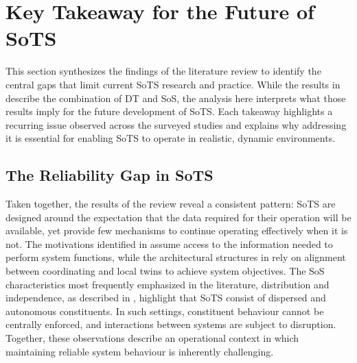 \section{Key Takeaway for the Future of SoTS}\label{sec:literature-review-key-takeaways}
This section synthesizes the findings of the literature review to identify the central gaps that limit current SoTS research and practice. While the results in  describe the combination of DT and SoS, the analysis here interprets what those results imply for the future development of SoTS. Each takeaway highlights a recurring issue observed across the surveyed studies and explains why addressing it is essential for enabling SoTS to operate in realistic, dynamic environments.


\subsection*{The Reliability Gap in SoTS}
Taken together, the results of the review reveal a consistent pattern: SoTS are designed around the expectation that the data required for their operation will be available, yet provide few mechanisms to continue operating effectively when it is not. The motivations identified in  assume access to the information needed to perform system functions, while the architectural structures in  rely on alignment between coordinating and local twins to achieve system objectives.
The SoS characteristics most frequently emphasized in the literature, distribution and independence, as described in , highlight that SoTS consist of dispersed and autonomous constituents. In such settings, constituent behaviour cannot be centrally enforced, and interactions between systems are subject to disruption. Together, these observations describe an operational context in which maintaining reliable system behaviour is inherently challenging.


